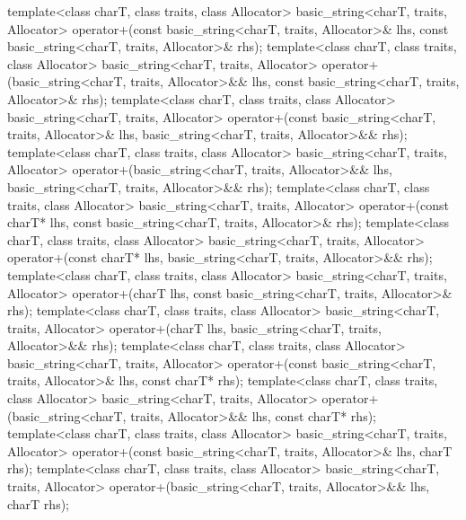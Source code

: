 \begin{codeblock}
{  template<class charT, class traits, class Allocator>
    basic_string<charT, traits, Allocator>
      operator+(const basic_string<charT, traits, Allocator>& lhs,
                const basic_string<charT, traits, Allocator>& rhs);
  template<class charT, class traits, class Allocator>
    basic_string<charT, traits, Allocator>
      operator+(basic_string<charT, traits, Allocator>&& lhs,
                const basic_string<charT, traits, Allocator>& rhs);
  template<class charT, class traits, class Allocator>
    basic_string<charT, traits, Allocator>
      operator+(const basic_string<charT, traits, Allocator>& lhs,
                basic_string<charT, traits, Allocator>&& rhs);
  template<class charT, class traits, class Allocator>
    basic_string<charT, traits, Allocator>
      operator+(basic_string<charT, traits, Allocator>&& lhs,
                basic_string<charT, traits, Allocator>&& rhs);
  template<class charT, class traits, class Allocator>
    basic_string<charT, traits, Allocator>
      operator+(const charT* lhs,
                const basic_string<charT, traits, Allocator>& rhs);
  template<class charT, class traits, class Allocator>
    basic_string<charT, traits, Allocator>
      operator+(const charT* lhs,
                basic_string<charT, traits, Allocator>&& rhs);
  template<class charT, class traits, class Allocator>
    basic_string<charT, traits, Allocator>
      operator+(charT lhs,
                const basic_string<charT, traits, Allocator>& rhs);
  template<class charT, class traits, class Allocator>
    basic_string<charT, traits, Allocator>
      operator+(charT lhs,
                basic_string<charT, traits, Allocator>&& rhs);
  template<class charT, class traits, class Allocator>
    basic_string<charT, traits, Allocator>
      operator+(const basic_string<charT, traits, Allocator>& lhs,
                const charT* rhs);
  template<class charT, class traits, class Allocator>
    basic_string<charT, traits, Allocator>
      operator+(basic_string<charT, traits, Allocator>&& lhs,
                const charT* rhs);
  template<class charT, class traits, class Allocator>
    basic_string<charT, traits, Allocator>
      operator+(const basic_string<charT, traits, Allocator>& lhs,
                charT rhs);
  template<class charT, class traits, class Allocator>
    basic_string<charT, traits, Allocator>
      operator+(basic_string<charT, traits, Allocator>&& lhs,
                charT rhs);

}
\end{codeblock}
